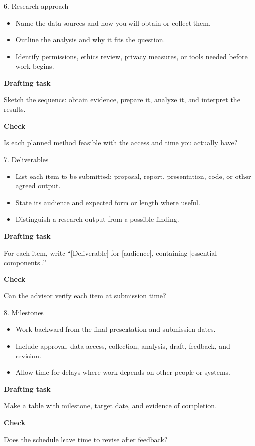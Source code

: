 \documentclass[aspectratio=43,11pt]{beamer}
\newcommand{\draft}[1]{\medskip\textbf{Drafting task}\par #1}
\newcommand{\checkit}[1]{\medskip\textbf{Check}\par #1}
\begin{document}
\begin{frame}{6. Research approach}
  \begin{itemize}
    \item Name the data sources and how you will obtain or collect them.
    \item Outline the analysis and why it fits the question.
    \item Identify permissions, ethics review, privacy measures, or tools needed before work begins.
  \end{itemize}
  
  \draft{Sketch the sequence: obtain evidence, prepare it, analyze it, and interpret the results.}
  
  \checkit{Is each planned method feasible with the access and time you actually have?}
\end{frame}

\begin{frame}{7. Deliverables}
  \begin{itemize}
    \item List each item to be submitted: proposal, report, presentation, code, or other agreed output.
    \item State its audience and expected form or length where useful.
    \item Distinguish a research output from a possible finding.
  \end{itemize}
  
  \draft{For each item, write ``[Deliverable] for [audience], containing [essential components].''}
  
  \checkit{Can the advisor verify each item at submission time?}
\end{frame}

\begin{frame}{8. Milestones}
  \begin{itemize}
    \item Work backward from the final presentation and submission dates.
    \item Include approval, data access, collection, analysis, draft, feedback, and revision.
    \item Allow time for delays where work depends on other people or systems.
  \end{itemize}
  
  \draft{Make a table with milestone, target date, and evidence of completion.}
  
  \checkit{Does the schedule leave time to revise after feedback?}
\end{frame}
\end{document}
